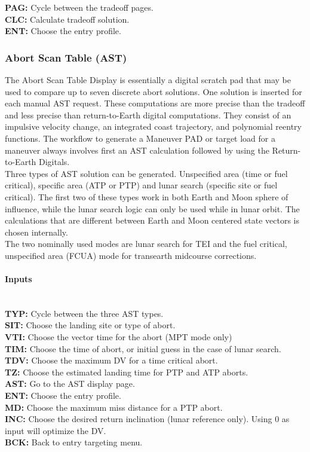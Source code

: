 \documentclass[11pt]{article} %
\begin{document}
\textbf{PAG:} Cycle between the tradeoff pages.\\
\textbf{CLC:} Calculate tradeoff solution.\\
\textbf{ENT:} Choose the entry profile.\\

\subsubsection{Abort Scan Table (AST)}

The Abort Scan Table Display is essentially a digital scratch pad that may be used to compare up to seven discrete abort solutions. One solution is inserted for
each manual AST request. These computations are more precise than the tradeoff and less precise than return-to-Earth digital computations. They consist of
an impulsive velocity change, an integrated coast trajectory, and polynomial reentry functions. The workflow to generate a Maneuver PAD or target load for a maneuver always involves first an AST calculation followed by using the Return-to-Earth Digitals.\\

Three types of AST solution can be generated. Unspecified area (time or fuel critical), specific area (ATP or PTP) and lunar search (specific site or fuel critical). The first two of these types work in both Earth and Moon sphere of influence, while the lunar search logic can only be used while in lunar orbit. The calculations that are different between Earth and Moon centered state vectors is chosen internally.\\

The two nominally used modes are lunar search for TEI and the fuel critical, unspecified area (FCUA) mode for transearth midcourse corrections.\\

\paragraph{Inputs}\mbox{} \\

\textbf{TYP:} Cycle between the three AST types.\\
\textbf{SIT:} Choose the landing site or type of abort.\\
\textbf{VTI:} Choose the vector time for the abort (MPT mode only)\\
\textbf{TIM:} Choose the time of abort, or initial guess in the case of lunar search.\\
\textbf{TDV:} Choose the maximum DV for a time critical abort.\\
\textbf{TZ:} Choose the estimated landing time for PTP and ATP aborts.\\
\textbf{AST:} Go to the AST display page.\\
\textbf{ENT:} Choose the entry profile.\\
\textbf{MD:} Choose the maximum miss distance for a PTP abort.\\
\textbf{INC:} Choose the desired return inclination (lunar reference only). Using 0 as input will optimize the DV.\\
\textbf{BCK:} Back to entry targeting menu.\\
\end{document}
